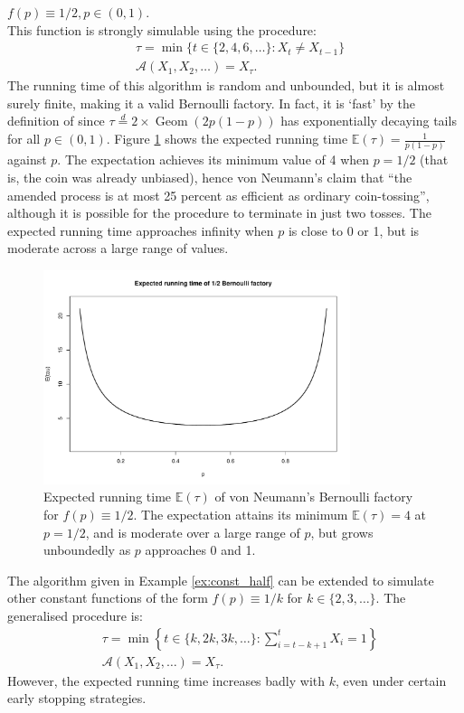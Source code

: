 \documentclass{article}
\theoremstyle{definition}
\newenvironment{example}
  {\pushQED{\qed}\renewcommand{\qedsymbol}{$\triangle$}\examplex}
  {\popQED\endexamplex}
\newcommand{\E}{\mathbb{E}}
\newcommand{\eqdist}{\overset{d}{=}}
\newcommand{\Geom}{\operatorname{Geom}}
\newcommand{\A}{\mathcal{A}}
\begin{document}
\begin{example}\label{ex:const_half}
$f(p) \equiv 1/2, p\in(0,1)$.\\
This function is strongly simulable using the procedure:
\begin{align*}
& \tau = \min\{ t \in \{2,4,6,\dots\} : X_t \neq X_{t-1} \} \\
& \A(X_1,X_2,\dots) = X_\tau.
\end{align*}
The running time of this algorithm is random and unbounded, but it is almost surely finite, making it a valid Bernoulli factory. In fact, it is `fast' by the definition of \citet{nacu2005} since $\tau \eqdist 2\times\Geom(2p(1-p))$ has exponentially decaying tails for all $p\in(0,1)$. Figure \ref{fig:runtime_const2} shows the expected running time $\E(\tau) = \frac{1}{p(1-p)}$ against $p$. The expectation achieves its minimum value of 4 when $p=1/2$ (that is, the coin was already unbiased), hence von Neumann's claim that ``the amended process is at most 25 percent as efficient as ordinary coin-tossing'', although it is possible for the procedure to terminate in just two tosses. The expected running time approaches infinity when $p$ is close to 0 or 1, but is moderate across a large range of values.
\begin{figure}
\centering
\includegraphics[width=0.8\textwidth]{vonneu_runtime.pdf}
\caption{Expected running time $\E(\tau)$ of von Neumann's Bernoulli factory for $f(p)\equiv 1/2$.  The expectation attains its minimum $\E(\tau)=4$ at $p=1/2$, and is moderate over a large range of $p$, but grows unboundedly as $p$ approaches 0 and 1.}
\label{fig:runtime_const2}
\end{figure}
\end{example}

The algorithm given in Example \ref{ex:const_half} can be extended to simulate other constant functions of the form $f(p)\equiv 1/k$ for $k\in \{2,3,\dots\}$. The generalised procedure is:
\begin{align*}
& \tau = \min\left\{ t \in \{k,2k,3k,\dots\} : \sum_{i=t-k+1}^t X_{i} = 1 \right\} \\
& \A(X_1,X_2,\dots) = X_\tau.
\end{align*}
However, the expected running time increases badly with $k$, even under certain early stopping strategies.
\end{document}
